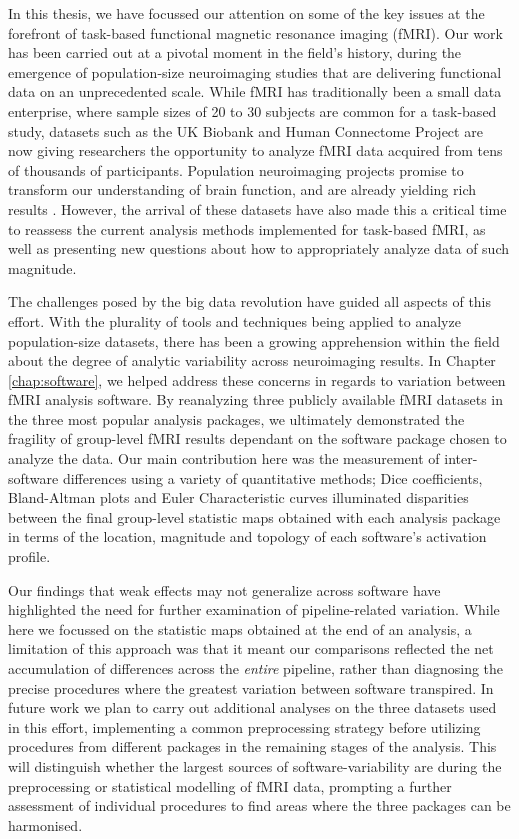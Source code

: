 In this thesis, we have focussed our attention on some of the key issues at the forefront of task-based functional magnetic resonance imaging (fMRI). Our work has been carried out at a pivotal moment in the field's history, during the emergence of population-size neuroimaging studies that are delivering functional data on an unprecedented scale. While fMRI has traditionally been a small data enterprise, where sample sizes of 20 to 30 subjects are common for a task-based study, datasets such as the UK Biobank and Human Connectome Project are now giving researchers the opportunity to analyze fMRI data acquired from tens of thousands of participants. Population neuroimaging projects promise to transform our understanding of brain function, and are already yielding rich results \citep{Miller2016-hd, David_C_Van_Essen2016-bt}. However, the arrival of these datasets have also made this a critical time to reassess the current analysis methods implemented for task-based fMRI, as well as presenting new questions about how to appropriately analyze data of such magnitude.

The challenges posed by the big data revolution have guided all aspects of this effort. With the plurality of tools and techniques being applied to analyze population-size datasets, there has been a growing apprehension within the field about the degree of analytic variability across neuroimaging results. In Chapter \ref{chap:software}, we helped address these concerns in regards to variation between fMRI analysis software. By reanalyzing three publicly available fMRI datasets in the three most popular analysis packages, we ultimately demonstrated the fragility of group-level fMRI results dependant on the software package chosen to analyze the data. Our main contribution here was the measurement of inter-software differences using a variety of quantitative methods; Dice coefficients, Bland-Altman plots and Euler Characteristic curves illuminated disparities between the final group-level statistic maps obtained with each analysis package in terms of the location, magnitude and topology of each software's activation profile. 

Our findings that weak effects may not generalize across software have highlighted the need for further examination of pipeline-related variation. While here we focussed on the statistic maps obtained at the end of an analysis, a limitation of this approach was that it meant our comparisons reflected the net accumulation of differences across the \textit{entire} pipeline, rather than diagnosing the precise procedures where the greatest variation between software transpired. In future work we plan to carry out additional analyses on the three datasets used in this effort, implementing a common preprocessing strategy before utilizing procedures from different packages in the remaining stages of the analysis. This will distinguish whether the largest sources of software-variability are during the preprocessing or statistical modelling of fMRI data, prompting a further assessment of individual procedures to find areas where the three packages can be harmonised. 

